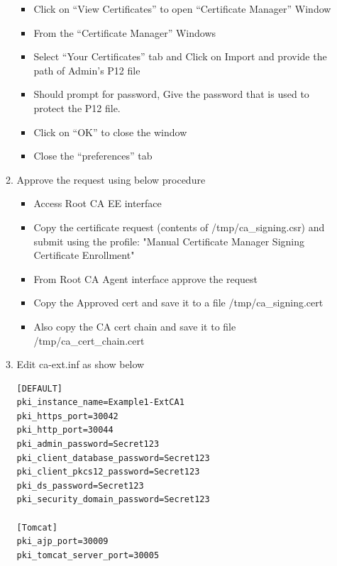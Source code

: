 \documentclass[12pt]{report}
\begin{document}
\begin{enumerate}[label*=\arabic*.]
\begin{enumerate}[label*=\arabic*.]
\begin{itemize}
                            \item Click on ``View Certificates'' to open ``Certificate Manager'' Window
                            \item From the ``Certificate Manager'' Windows 
                            \item Select ``Your Certificates'' tab and Click on Import and provide the path
                                of Admin's P12 file 
                            \item Should prompt for password, Give the password that is used to protect the P12 file.
                            \item Click on ``OK'' to close the window
                            \item Close the ``preferences'' tab
                        \end{itemize}
                    \item Approve the request using below procedure
                        \begin{itemize}
                            \item Access Root CA EE interface
                            \item Copy the certificate request (contents of /tmp/ca\_signing.csr) and submit using the profile:
                                    "Manual Certificate Manager Signing Certificate Enrollment"
                            \item From Root CA Agent interface approve the request
                            \item Copy the Approved cert and save it to a file /tmp/ca\_signing.cert
                            \item Also copy the CA cert chain and save it to file /tmp/ca\_cert\_chain.cert
                        \end{itemize}
                    \item Edit ca-ext.inf as show below
                        \begin{lstlisting}[style=configFile]
[DEFAULT]
pki_instance_name=Example1-ExtCA1
pki_https_port=30042
pki_http_port=30044
pki_admin_password=Secret123
pki_client_database_password=Secret123
pki_client_pkcs12_password=Secret123
pki_ds_password=Secret123
pki_security_domain_password=Secret123

[Tomcat]
pki_ajp_port=30009
pki_tomcat_server_port=30005



\end{lstlisting}
\end{enumerate}
\end{enumerate}
\end{document}
